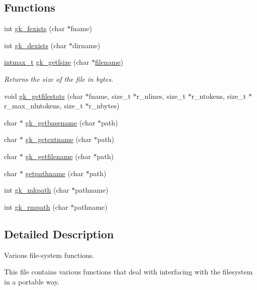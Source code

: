 \subsection*{Functions}
\begin{DoxyCompactItemize}
\item 
int \hyperlink{a00035_a627221a374552b5b6659d855b7446187}{gk\+\_\+fexists} (char $\ast$fname)
\item 
int \hyperlink{a00035_ac489be391410e38e025f83cf013c90ca}{gk\+\_\+dexists} (char $\ast$dirname)
\item 
\hyperlink{a00119_a036cd61bb4b30bb510b9538af4cebd1d}{intmax\+\_\+t} \hyperlink{a00035_ab8e9c3fc4ed1161501b51e445afde0e5}{gk\+\_\+getfsize} (char $\ast$\hyperlink{a00623_a42a21beb8018ac623f4d09db1343b9cf}{filename})
\begin{DoxyCompactList}\small\item\em Returns the size of the file in bytes. \end{DoxyCompactList}\item 
void \hyperlink{a00035_a739112cb142f2e96d6952140c66cd31c}{gk\+\_\+getfilestats} (char $\ast$fname, size\+\_\+t $\ast$r\+\_\+nlines, size\+\_\+t $\ast$r\+\_\+ntokens, size\+\_\+t $\ast$r\+\_\+max\+\_\+nlntokens, size\+\_\+t $\ast$r\+\_\+nbytes)
\item 
char $\ast$ \hyperlink{a00035_ad732cbb6372e1eb9b396792f700091a5}{gk\+\_\+getbasename} (char $\ast$path)
\item 
char $\ast$ \hyperlink{a00035_a4d728cd9869792eb93b315f949819d99}{gk\+\_\+getextname} (char $\ast$path)
\item 
char $\ast$ \hyperlink{a00035_a742e52c08aa7e46acd66cde95045d935}{gk\+\_\+getfilename} (char $\ast$path)
\item 
char $\ast$ \hyperlink{a00035_abae64e0957b2369082de428989501f5f}{getpathname} (char $\ast$path)
\item 
int \hyperlink{a00035_ab7c5c98647a9e3366fbe03a3a12f1f80}{gk\+\_\+mkpath} (char $\ast$pathname)
\item 
int \hyperlink{a00035_a8859354bba4be7b1eb2a3846684fd1f9}{gk\+\_\+rmpath} (char $\ast$pathname)
\end{DoxyCompactItemize}


\subsection{Detailed Description}
Various file-\/system functions. 

This file contains various functions that deal with interfacing with the filesystem in a portable way.

